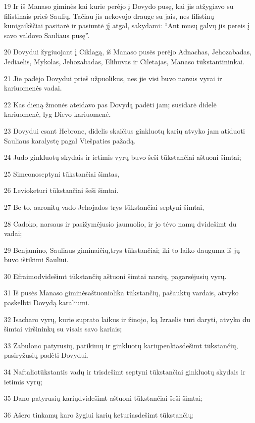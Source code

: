 \par 19 Ir iš Manaso giminės kai kurie perėjo į Dovydo pusę, kai jis atžygiavo su filistinais prieš Saulių. Tačiau jis nekovojo drauge su jais, nes filistinų kunigaikščiai pasitarė ir pasiuntė jį atgal, sakydami: “Ant mūsų galvų jis pereis į savo valdovo Sauliaus pusę”. 
\par 20 Dovydui žygiuojant į Ciklagą, iš Manaso pusės perėjo Adnachas, Jehozabadas, Jediaelis, Mykolas, Jehozabadas, Elihuvas ir Ciletajas, Manaso tūkstantininkai. 
\par 21 Jie padėjo Dovydui prieš užpuolikus, nes jie visi buvo narsūs vyrai ir kariuomenės vadai. 
\par 22 Kas dieną žmonės ateidavo pas Dovydą padėti jam; susidarė didelė kariuomenė, lyg Dievo kariuomenė. 
\par 23 Dovydui esant Hebrone, didelis skaičius ginkluotų karių atvyko jam atiduoti Sauliaus karalystę pagal Viešpaties pažadą. 
\par 24 Judo ginkluotų skydais ir ietimis vyrų buvo šeši tūkstančiai aštuoni šimtai; 
\par 25 Simeono­septyni tūkstančiai šimtas, 
\par 26 Levio­keturi tūkstančiai šeši šimtai. 
\par 27 Be to, aaronitų vado Jehojados­ trys tūkstančiai septyni šimtai, 
\par 28 Cadoko, narsaus ir pasižymėjusio jaunuolio, ir jo tėvo namų­ dvidešimt du vadai; 
\par 29 Benjamino, Sauliaus giminaičių,­trys tūkstančiai; iki to laiko dauguma iš jų buvo ištikimi Sauliui. 
\par 30 Efraimo­dvidešimt tūkstančių aštuoni šimtai narsių, pagarsėjusių vyrų. 
\par 31 Iš pusės Manaso giminės­aštuoniolika tūkstančių, pašauktų vardais, atvyko paskelbti Dovydą karaliumi. 
\par 32 Isacharo vyrų, kurie suprato laikus ir žinojo, ką Izraelis turi daryti, atvyko du šimtai viršininkų su visais savo kariais; 
\par 33 Zabulono patyrusių, patikimų ir ginkluotų karių­penkiasdešimt tūkstančių, pasiryžusių padėti Dovydui. 
\par 34 Naftalio­tūkstantis vadų ir trisdešimt septyni tūkstančiai ginkluotų skydais ir ietimis vyrų; 
\par 35 Dano patyrusių karių­dvidešimt aštuoni tūkstančiai šeši šimtai; 
\par 36 Ašero tinkamų karo žygiui karių­ keturiasdešimt tūkstančių; 
